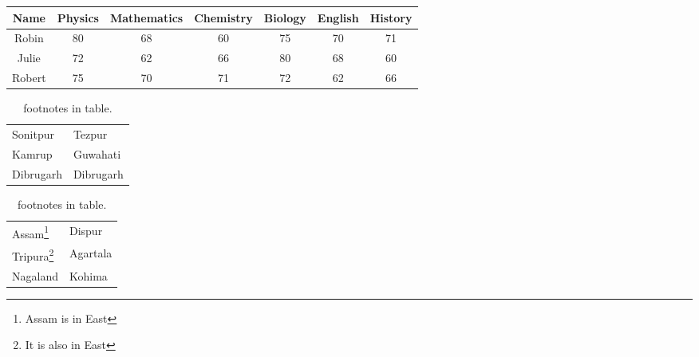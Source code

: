 \documentclass{article}
\begin{document}

\begin{sidewaystable}
    \centering
    \caption{Marks obtained by three students in different subjects.}
    \begin{tabular}{|*{7}{c|}}
        \hline Name   & Physics & Mathematics & Chemistry & Biology & English & History \\
        \hline Robin  & 80      & 68          & 60        & 75      & 70      & 71      \\
        \hline Julie  & 72      & 62          & 66        & 80      & 68      & 60      \\
        \hline Robert & 75      & 70          & 71        & 72      & 62      & 66      \\
        \hline
    \end{tabular}
\end{sidewaystable}


\begin{table}[!hbt]
    \centering
    \caption{footnotes in table.}
\begin{tabular}{|l|l|}
    \hline Sonitpur\footnotemark & Tezpur    \\
    Kamrup                       & Guwahati  \\
    Dibrugarh                    & Dibrugarh \\
    \hline
\end{tabular}
%
\begin{minipage}[t]{5cm}
    \begin{tabular}{|l|l|}
        \hline
        Assam\footnote{Assam is in East}     & Dispur   \\
        Tripura\footnote{It is also in East} & Agartala \\
        Nagaland                             & Kohima   \\
        \hline
    \end{tabular}
\end{minipage}
\end{table}
\end{document}
